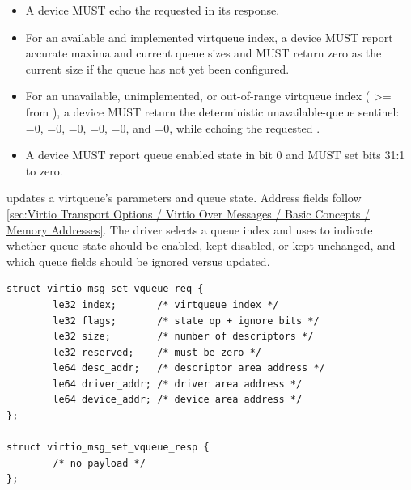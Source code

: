 \begin{itemize}
  \item A device MUST echo the requested  in its response.
  \item For an available and implemented virtqueue index, a device MUST report
        accurate maxima and current queue sizes and MUST return zero as the
        current size if the queue has not yet been configured.
  \item For an unavailable, unimplemented, or out-of-range virtqueue index
        ( >=  from ),
        a device MUST return the deterministic unavailable-queue sentinel:
        =0, =0, =0,
        =0, =0, and =0,
        while echoing the requested .
  \item A device MUST report queue enabled state in  bit 0 and
        MUST set  bits 31:1 to zero.
\end{itemize}


 updates a virtqueue's parameters and queue state. Address
fields follow
\ref{sec:Virtio Transport Options / Virtio Over Messages / Basic Concepts / Memory Addresses}.
The driver selects a queue index and uses  to indicate whether queue
state should be enabled, kept disabled, or kept unchanged, and which queue
fields should be ignored versus updated.

\begin{lstlisting}
struct virtio_msg_set_vqueue_req {
        le32 index;       /* virtqueue index */
        le32 flags;       /* state op + ignore bits */
        le32 size;        /* number of descriptors */
        le32 reserved;    /* must be zero */
        le64 desc_addr;   /* descriptor area address */
        le64 driver_addr; /* driver area address */
        le64 device_addr; /* device area address */
};

struct virtio_msg_set_vqueue_resp {
        /* no payload */
};
\end{lstlisting}


